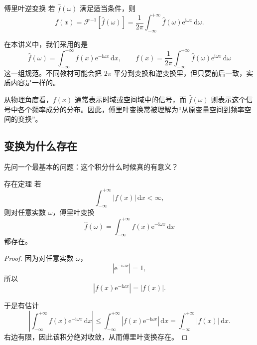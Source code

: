\begin{dingliyi}{傅里叶逆变换}{}
若 $\hat{f}(\omega)$ 满足适当条件，则
\begin{equation}
    f(x)=\mathcal{F}^{-1}[\hat{f}(\omega)]
    =
    \frac{1}{2\pi}\int_{-\infty}^{+\infty} \hat{f}(\omega)\mathrm{e}^{\mathrm{i}\omega x}\,\mathrm{d}\omega.
\end{equation}
\end{dingliyi}

\begin{tishi}[这一对公式在说什么]
在本讲义中，我们采用的是
\[
    \hat{f}(\omega)=\int_{-\infty}^{+\infty} f(x)\mathrm{e}^{-\mathrm{i}\omega x}\,\mathrm{d}x,
    \qquad
    f(x)=\frac{1}{2\pi}\int_{-\infty}^{+\infty} \hat{f}(\omega)\mathrm{e}^{\mathrm{i}\omega x}\,\mathrm{d}\omega
\]
这一组规范。不同教材可能会把 $2\pi$ 平分到变换和逆变换里，但只要前后一致，实质内容是一样的。
\end{tishi}

从物理角度看，$f(x)$ 通常表示时域或空间域中的信号，而 $\hat{f}(\omega)$ 则表示这个信号中各个频率成分的分布。因此，傅里叶变换常被理解为``从原变量空间到频率空间的变换''。

\subsection{变换为什么存在}

先问一个最基本的问题：这个积分什么时候真的有意义？

\begin{dingli}{存在定理}{}
若
\begin{equation}
    \int_{-\infty}^{+\infty} |f(x)|\,\mathrm{d}x < \infty,
\end{equation}
则对任意实数 $\omega$，傅里叶变换
\begin{equation}
    \hat{f}(\omega)=\int_{-\infty}^{+\infty} f(x)\mathrm{e}^{-\mathrm{i}\omega x}\,\mathrm{d}x
\end{equation}
都存在。
\end{dingli}

\begin{proof}
因为对任意实数 $\omega$，
\begin{equation}
    \left|\mathrm{e}^{-\mathrm{i}\omega x}\right|=1,
\end{equation}
所以
\begin{equation}
    \left|f(x)\mathrm{e}^{-\mathrm{i}\omega x}\right|=|f(x)|.
\end{equation}

于是有估计
\begin{equation}
    \left|
        \int_{-\infty}^{+\infty}
        f(x)\mathrm{e}^{-\mathrm{i}\omega x}\,\mathrm{d}x
    \right|
    \le
    \int_{-\infty}^{+\infty}
    \left|f(x)\mathrm{e}^{-\mathrm{i}\omega x}\right|\,\mathrm{d}x
    =
    \int_{-\infty}^{+\infty}
    |f(x)|\,\mathrm{d}x.
\end{equation}
右边有限，因此该积分绝对收敛，从而傅里叶变换存在。
\end{proof}

